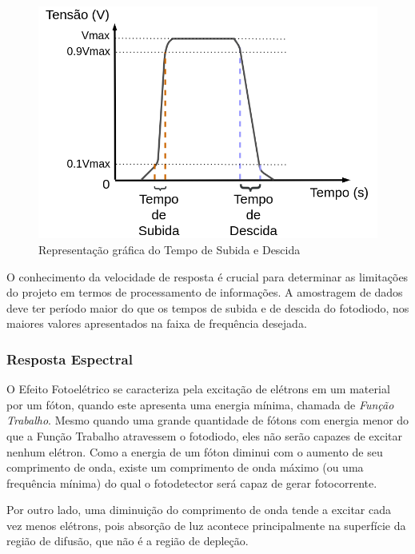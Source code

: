 \begin{figure}[!h]
	\caption{\label{fig_velocidadeResp}Representação gr\'afica do Tempo de Subida e Descida}
	\begin{center}
	    \includegraphics[scale=0.3]{Imagens/GraficoVelocidadeResposta.png}
	\end{center}
\end{figure}

O conhecimento da velocidade de resposta \'e crucial para determinar as limitações do projeto em termos de processamento de informações. A amostragem de dados deve ter período maior do que os tempos de subida e de descida do fotodiodo, nos maiores valores apresentados na faixa de frequência desejada.

\subsubsection{Resposta Espectral}

O Efeito Fotoel\'etrico se caracteriza pela excitação de el\'etrons em um material por um fóton, quando este apresenta uma energia mínima, chamada de \textit{Função Trabalho}. Mesmo quando uma grande quantidade de fótons com energia menor do que a Função Trabalho atravessem o fotodiodo, eles não serão capazes de excitar nenhum el\'etron. Como a energia de um fóton diminui com o aumento de seu comprimento de onda, existe um comprimento de onda máximo (ou uma frequência mínima) do qual o fotodetector será capaz de gerar fotocorrente.

Por outro lado, uma diminuição do comprimento de onda tende a excitar cada vez menos el\'etrons, pois absorção de luz acontece principalmente na superfície da região de difusão, que não é a região de depleção.

